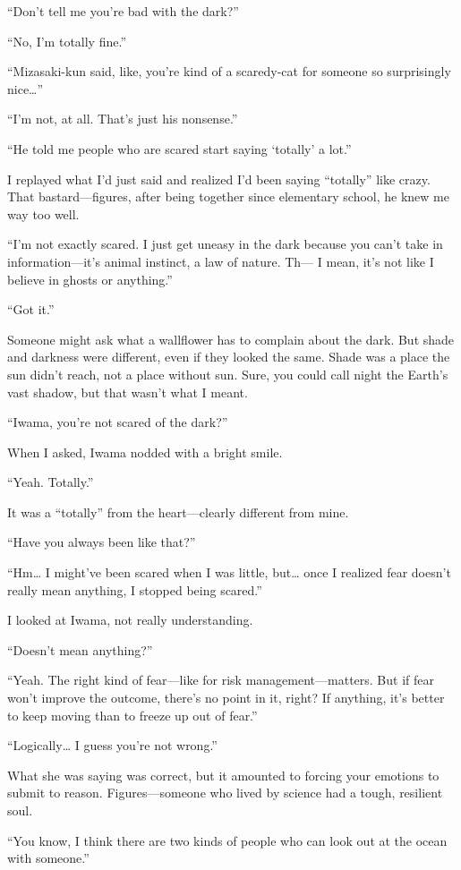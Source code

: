 \documentclass[
    a4paper,
    12pt,
    twoside,
    openany,
    UTF8,
    fontset=windows
]{ctexbook}
\begin{document}
“Don’t tell me you’re bad with the dark?”

“No, I’m totally fine.”

“Mizasaki-kun said, like, you’re kind of a scaredy-cat for someone so surprisingly nice…”

“I’m not, at all. That’s just his nonsense.”

“He told me people who are scared start saying ‘totally’ a lot.”

I replayed what I’d just said and realized I’d been saying “totally” like crazy. That bastard—figures, after being together since elementary school, he knew me way too well.

“I’m not exactly scared. I just get uneasy in the dark because you can’t take in information—it’s animal instinct, a law of nature. Th— I mean, it’s not like I believe in ghosts or anything.”

“Got it.”

Someone might ask what a wallflower has to complain about the dark. But shade and darkness were different, even if they looked the same. Shade was a place the sun didn’t reach, not a place without sun. Sure, you could call night the Earth’s vast shadow, but that wasn’t what I meant.

“Iwama, you’re not scared of the dark?”

When I asked, Iwama nodded with a bright smile.

“Yeah. Totally.”

It was a “totally” from the heart—clearly different from mine.

“Have you always been like that?”


“Hm… I might’ve been scared when I was little, but… once I realized fear doesn’t really mean anything, I stopped being scared.”

I looked at Iwama, not really understanding.

“Doesn’t mean anything?”

“Yeah. The right kind of fear—like for risk management—matters. But if fear won’t improve the outcome, there’s no point in it, right? If anything, it’s better to keep moving than to freeze up out of fear.”

“Logically… I guess you’re not wrong.”

What she was saying was correct, but it amounted to forcing your emotions to submit to reason. Figures—someone who lived by science had a tough, resilient soul.

“You know, I think there are two kinds of people who can look out at the ocean with someone.”
\end{document}
